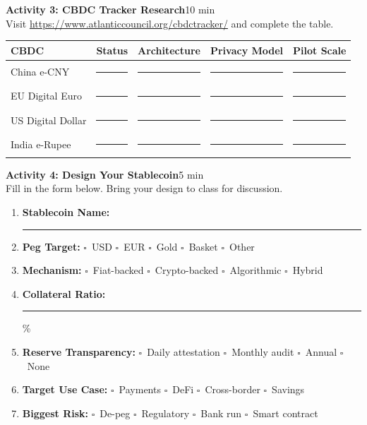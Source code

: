\documentclass[11pt,a4paper]{article}
\newcommand{\activitybox}[3]{%
  \noindent\colorbox{mllavender4}{\parbox{\dimexpr\linewidth-2\fboxsep}{%
    \textbf{\color{mlpurple}#1}\hfill\textcolor{mlgray}{\small #2}\\[2pt]#3%
  }}\par\vspace{4pt}%
}
\newcommand{\fillcell}{\rule{2.2cm}{0.3pt}}
\begin{document}
\vspace{2pt}

\activitybox{Activity 3: CBDC Tracker Research}{10 min}{%
Visit \url{https://www.atlanticcouncil.org/cbdctracker/} and complete the table.\\[2pt]
\begin{center}
\renewcommand{\arraystretch}{1.35}
\begin{tabular}{@{}lcccc@{}}
\toprule
\textbf{CBDC} & \textbf{Status} & \textbf{Architecture} & \textbf{Privacy Model} & \textbf{Pilot Scale} \\
\midrule
China e-CNY          & \fillcell & \fillcell & \fillcell & \fillcell \\
EU Digital Euro      & \fillcell & \fillcell & \fillcell & \fillcell \\
US Digital Dollar    & \fillcell & \fillcell & \fillcell & \fillcell \\
India e-Rupee        & \fillcell & \fillcell & \fillcell & \fillcell \\
\bottomrule
\end{tabular}
\end{center}
}

\vspace{2pt}

\activitybox{Activity 4: Design Your Stablecoin}{5 min}{%
Fill in the form below. Bring your design to class for discussion.
\begin{enumerate}
\item \textbf{Stablecoin Name:}~\rule{5cm}{0.3pt}
\item \textbf{Peg Target:}\quad
      $\square$~USD\quad
      $\square$~EUR\quad
      $\square$~Gold\quad
      $\square$~Basket\quad
      $\square$~Other
\item \textbf{Mechanism:}\quad
      $\square$~Fiat-backed\quad
      $\square$~Crypto-backed\quad
      $\square$~Algorithmic\quad
      $\square$~Hybrid
\item \textbf{Collateral Ratio:}~\rule{1.5cm}{0.3pt}\%
\item \textbf{Reserve Transparency:}\quad
      $\square$~Daily attestation\quad
      $\square$~Monthly audit\quad
      $\square$~Annual\quad
      $\square$~None
\item \textbf{Target Use Case:}\quad
      $\square$~Payments\quad
      $\square$~DeFi\quad
      $\square$~Cross-border\quad
      $\square$~Savings
\item \textbf{Biggest Risk:}\quad
      $\square$~De-peg\quad
      $\square$~Regulatory\quad
      $\square$~Bank run\quad
      $\square$~Smart contract
\end{enumerate}
}
\end{document}
